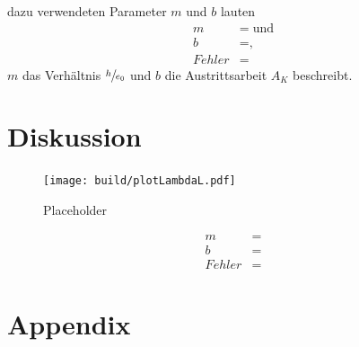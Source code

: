     \justifying dazu verwendeten Parameter $m$ und $b$ lauten
    \begin{align}
    m &= \text{}\;\text{und} \label{eq:20}\\
    b &= \text{,} \label{eq:21}\\
    Fehler &= \text{}   
    \end{align}
    \justifying $m$ das Verhältnis $\sfrac{h}{e_0}$ und $b$ die Austrittsarbeit $A_K$ beschreibt.

\section{Diskussion}

    \begin{figure}[H]
        \centering
        \texttt{[image: build/plotLambdaL.pdf]}
        \caption{Placeholder}
        \label{fig:10}
    \end{figure}

    \begin{align}
    m &= \text{}\\
    b &= \text{}\\
    Fehler &= \text{}   
    \end{align}

\newpage
\printbibliography

\newpage
\section{Appendix}

\begin{table}[H]
    \centering
    \caption{}
    
    \label{tab:1}
\end{table}

\begin{table}[H]
    \centering
    \caption{}
    
    \label{tab:2}
\end{table}

\begin{table}[H]
    \centering
    \caption{}
    
    \label{tab:3}
\end{table}




